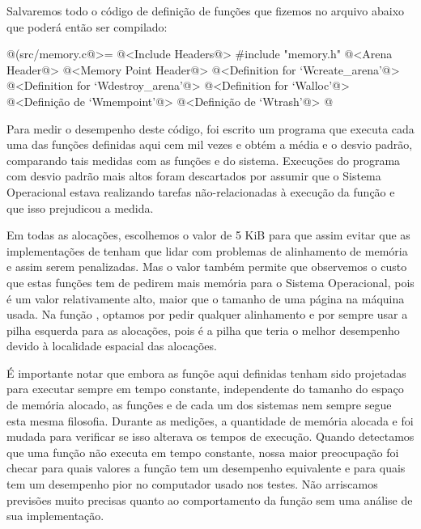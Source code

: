 
Salvaremos todo o código de definição de funções que fizemos no
arquivo abaixo que poderá então ser compilado:

\iniciocodigo
@(src/memory.c@>=
@<Include Headers@>
#include "memory.h"
@<Arena Header@>
@<Memory Point Header@>
@<Definition for `Wcreate\_arena'@>
@<Definition for `Wdestroy\_arena'@>
@<Definition for `Walloc'@>
@<Definição de `Wmempoint'@>
@<Definição de `Wtrash'@>
@
\fimcodigo


Para medir o desempenho deste código, foi escrito um programa que
executa cada uma das funções definidas aqui cem mil vezes e obtém
a média e o desvio padrão, comparando tais medidas com as
funções  e  do sistema. Execuções
do programa com desvio padrão mais altos foram descartados por assumir
que o Sistema Operacional estava realizando tarefas não-relacionadas à
execução da função e que isso prejudicou a medida.

Em todas as alocações, escolhemos o valor de 5 KiB para que assim
evitar que as implementações de  tenham que lidar
com problemas de alinhamento de memória e assim serem penalizadas. Mas
o valor também permite que observemos o custo que estas funções tem de
pedirem mais memória para o Sistema Operacional, pois é um valor
relativamente alto, maior que o tamanho de uma página na máquina
usada. Na função , optamos por pedir qualquer
alinhamento e por sempre usar a pilha esquerda para as alocações, pois
é a pilha que teria o melhor desempenho devido à localidade espacial
das alocações.

É importante notar que embora as funçõe aqui definidas tenham sido
projetadas para executar sempre em tempo constante, independente do
tamanho do espaço de memória alocado, as funções 
e  de cada um dos sistemas nem sempre segue esta
mesma filosofia. Durante as medições, a quantidade de memória alocada
e foi mudada para verificar se isso alterava os tempos de
execução. Quando detectamos que uma função não executa em tempo
constante, nossa maior preocupação foi checar para quais valores a
função tem um desempenho equivalente e para quais tem um desempenho
pior no computador usado nos testes. Não arriscamos previsões muito
precisas quanto ao comportamento da função sem uma análise de sua
implementação.


